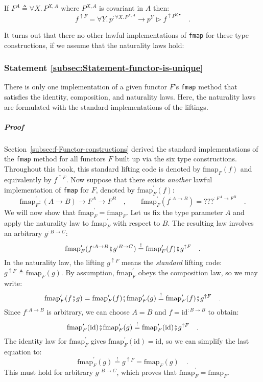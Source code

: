 If $F^{A}\triangleq\forall X.\,P^{X,A}$ where $P^{X,A}$ is covariant
in $A$ then: 
\[
f^{\uparrow F}=\forall Y.\,p^{:\forall X.\,P^{X,A}}\rightarrow p^{Y}\triangleright f^{\uparrow P^{Y,\bullet}}\quad.
\]

It turns out that there no other lawful implementations of \lstinline!fmap!
for these type constructions, if we assume that the naturality laws
hold:

\subsubsection{Statement \label{subsec:Statement-functor-is-unique}\ref{subsec:Statement-functor-is-unique}}

There is only one implementation of a given functor $F$\textsf{'}s \lstinline!fmap!
method that satisfies the identity, composition, and naturality laws.
Here, the naturality laws are formulated with the standard implementations
of the liftings.

\subparagraph{Proof}

Section~\ref{subsec:f-Functor-constructions} derived the standard
implementations of the \lstinline!fmap! method for all functors $F$
built up via the six type constructions. Throughout this book, this
standard lifting code is denoted by $\text{fmap}_{F}(f)$ and equivalently
by $f^{\uparrow F}$. Now suppose that there exists \emph{another}
lawful implementation of \lstinline!fmap! for $F$, denoted by $\text{fmap}_{F}^{\prime}(f)$:
\[
\text{fmap}_{F}^{\prime}:\left(A\rightarrow B\right)\rightarrow F^{A}\rightarrow F^{B}\quad,\quad\quad\text{fmap}_{F}^{\prime}(f^{:A\rightarrow B})=\text{???}^{:F^{A}\rightarrow F^{B}}\quad.
\]
We will now show that $\text{fmap}_{F}^{\prime}=\text{fmap}_{F}$.
Let us fix the type parameter $A$ and apply the naturality law to
$\text{fmap}_{F}^{\prime}$ with respect to $B$. The resulting law
involves an arbitrary $g^{:B\rightarrow C}$:
\[
\text{fmap}_{F}^{\prime}(f^{:A\rightarrow B}\bef g^{:B\rightarrow C})\overset{!}{=}\text{fmap}_{F}^{\prime}(f)\bef g^{\uparrow F}\quad.
\]
In the naturality law, the lifting $g^{\uparrow F}$ means the \emph{standard}
lifting code: $g^{\uparrow F}\triangleq\text{fmap}_{F}(g)$. By assumption,
$\text{fmap}_{F}^{\prime}$ obeys the composition law, so we may write:
\[
\text{fmap}_{F}^{\prime}(f\bef g)=\text{fmap}_{F}^{\prime}(f)\bef\text{fmap}_{F}^{\prime}(g)\overset{!}{=}\text{fmap}_{F}^{\prime}(f)\bef g^{\uparrow F}\quad.
\]
Since $f^{:A\rightarrow B}$ is arbitrary, we can choose $A=B$ and
$f=\text{id}^{:B\rightarrow B}$ to obtain:
\[
\text{fmap}_{F}^{\prime}(\text{id})\bef\text{fmap}_{F}^{\prime}(g)\overset{!}{=}\text{fmap}_{F}^{\prime}(\text{id})\bef g^{\uparrow F}\quad.
\]
The identity law for $\text{fmap}_{F}^{\prime}$ gives $\text{fmap}_{F}^{\prime}(\text{id})=\text{id}$,
so we can simplify the last equation to:
\[
\text{fmap}_{F}^{\prime}(g)\overset{!}{=}g^{\uparrow F}=\text{fmap}_{F}(g)\quad.
\]
This must hold for arbitrary $g^{:B\rightarrow C}$, which proves
that $\text{fmap}_{F}^{\prime}=\text{fmap}_{F}$.


